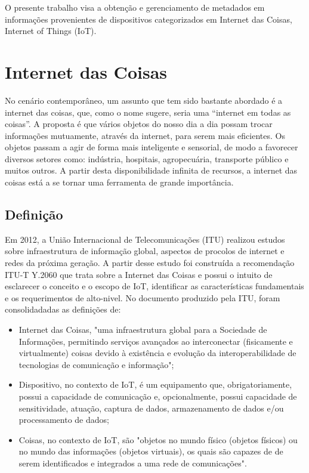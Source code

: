 O presente trabalho visa a obtenção e gerenciamento de metadados em informações provenientes de
dispositivos categorizados em Internet das Coisas, Internet of Things (IoT). %


\section{Internet das Coisas}%
No cenário contemporâneo, um assunto que tem sido bastante abordado é a
internet das coisas, que, como o nome sugere, seria uma “internet em todas as
coisas”. A proposta é que vários objetos do nosso dia a dia possam trocar informações
mutuamente, através da internet, para serem mais eficientes. Os objetos passam a agir
de forma mais inteligente e sensorial, de modo a favorecer diversos setores como:
indústria, hospitais, agropecuária, transporte público e muitos outros. A partir desta
disponibilidade infinita de recursos, a internet das coisas está a se tornar uma ferramenta
de grande importância.
\subsection{Definição}
	Em 2012, a União Internacional de Telecomunicações (ITU) realizou estudos sobre infraestrutura
	de informação global, aspectos de procolos de internet e redes da próxima geração.
	A partir desse estudo foi construída a recomendação ITU-T Y.2060 que trata sobre a Internet
	das Coisas e possui o intuito de esclarecer o conceito e o escopo de IoT, identificar
	as características fundamentais e os requerimentos de alto-nivel.
	No documento produzido pela ITU, foram consolidadadas as definições de:
	\begin{itemize}
		\item Internet das Coisas, "uma infraestrutura global para a Sociedade de Informações, permitindo serviços avançados ao
		interconectar (fisicamente e virtualmente) coisas devido à existência e evolução da interoperabilidade
	de tecnologias de comunicação e informação";
		\item Dispositivo, no contexto de IoT, é um equipamento que, obrigatoriamente, possui a capacidade
		de comunicação e, opcionalmente, possui capacidade de sensitividade, atuação, captura de dados,
		armazenamento de dados e/ou processamento de dados;
		\item Coisas, no contexto de IoT, são "objetos
	no mundo físico (objetos físicos) ou no mundo das informações (objetos virtuais), os quais são capazes de
	de serem identificados e integrados a uma rede de comunicações".
	\end{itemize}

